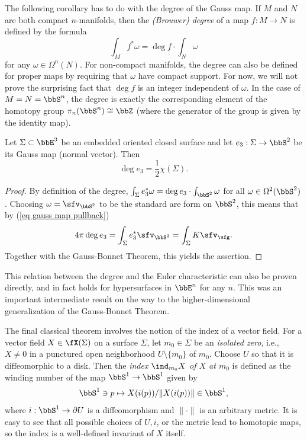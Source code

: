 The following corollary has to do with the degree of the Gauss map. If $M$ and $N$ are both compact $n$-manifolds, then the \emph{(Brouwer) degree} of a map $f:M\to N$ is defined by the formula 
\[\int_M f^\ast \omega=\deg f\cdot \int_N\omega\]
for any $\omega\in\Omega^n(N)$. For non-compact manifolds, the degree can also be defined for proper maps by requiring that $\omega$ have compact support. For now, we will not prove the surprising fact that $\deg f$ is an integer independent of $\omega$. In the case of $M=N=\bbS^n$, the degree is exactly the corresponding element of the homotopy group $\pi_n(\bbS^n)\cong\bbZ$ (where the generator of the group is given by the identity map).

\begin{cor}
    Let $\Sigma\subset\bbE^3$ be an embedded oriented closed surface and let $e_3:\Sigma\to \bbS^2$ be its Gauss map (normal vector). Then 
    \[\deg e_3=\frac12 \chi(\Sigma).\]
\end{cor}
\begin{proof}
    By definition of the degree, $\int_\Sigma e_3^\ast \omega=\deg e_3\cdot\int_{\bbS^2}\omega$ for all $\omega\in\Omega^2(\bbS^2)$. Choosing $\omega=\sfv_{\bbS^2}$ to be the standard are form on $\bbS^2$, this means that by (\ref{eq gauss map pullback})
    \[4\pi \deg e_3=\int_\Sigma e_3^\ast \sfv_{\bbS^2}=\int_\Sigma K \sfv_\sfg.\]
    Together with the Gauss-Bonnet Theorem, this yields the assertion.
\end{proof}

This relation between the degree and the Euler characteristic can also be proven directly, and in fact holds for hypersurfaces in $\bbE^n$ for any $n$. This was an important intermediate result on the way to the higher-dimensional generalization of the Gauss-Bonnet Theorem.

The final classical theorem involves the notion of the index of a vector field. For a vector field $X\in\fX(\Sigma)$ on a surface $\Sigma$, let $m_0\in \Sigma$ be an \emph{isolated zero}, i.e., $X\neq 0$ in a punctured open neighborhood $U\setminus\{m_0\}$ of $m_0$. Choose $U$ so that it is diffeomorphic to a disk. Then the \emph{index $\ind_{m_0}X$ of $X$ at $m_0$} is defined as the winding number of the map $\bbS^1\to \bbS^1$ given by 
\[\bbS^1\ni p\mapsto X(i(p))/\lVert X(i(p))\rVert\in\bbS^1,\]
where $i:\bbS^1\to \partial U$ is a diffeomorphism and $\lVert\cdot\rVert$ is an arbitrary metric. It is easy to see that all possible choices of $U, i$, or the metric lead to homotopic maps, so the index is a well-defined invariant of $X$ itself. 

